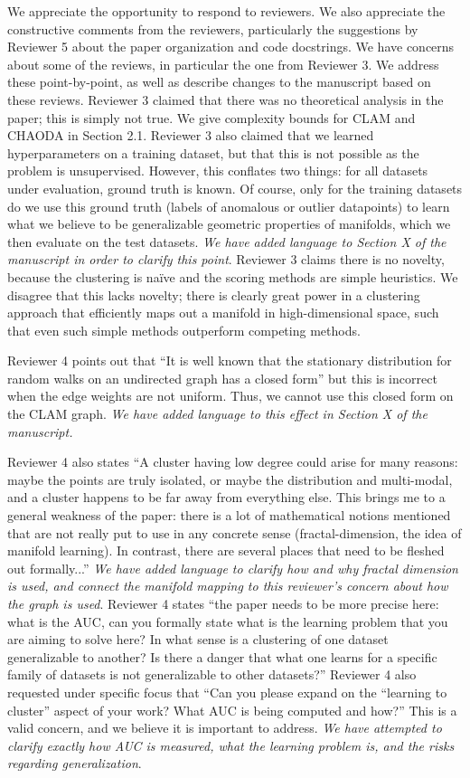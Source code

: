 \documentclass{article}
\begin{document}
We appreciate the opportunity to respond to reviewers.
We also appreciate the constructive comments from the reviewers, particularly the suggestions by Reviewer 5 about the paper organization and code docstrings.
We have concerns about some of the reviews, in particular the one from Reviewer 3.
We address these point-by-point, as well as describe changes to the manuscript based on these reviews.
Reviewer 3 claimed that there was no theoretical analysis in the paper; this is simply not true.
We give complexity bounds for CLAM and CHAODA in Section 2.1.
Reviewer 3 also claimed that we learned hyperparameters on a training dataset, but that this is not possible as the problem is unsupervised.
However, this conflates two things: for all datasets under evaluation, ground truth is known.
Of course, only for the training datasets do we use this ground truth (labels of anomalous or outlier datapoints) to learn what we believe to be generalizable geometric properties of manifolds, which we then evaluate on the test datasets.
\emph{We have added language to Section X of the manuscript in order to clarify this point}.
Reviewer 3 claims there is no novelty, because the clustering is na\"ive and the scoring methods are simple heuristics.
We disagree that this lacks novelty; there is clearly great power in a clustering approach that efficiently maps out a manifold in high-dimensional space, such that even such simple methods outperform competing methods.

Reviewer 4 points out that ``It is well known that the stationary distribution for random walks on an undirected graph has a closed form'' but this is incorrect when the edge weights are not uniform.
Thus, we cannot use this closed form on the CLAM graph.
\emph{We have added language to this effect in Section X of the manuscript.}

Reviewer 4 also states ``A cluster having low degree could arise for many reasons: maybe the points are truly isolated, or maybe the distribution and multi-modal, and a cluster happens to be far away from everything else. 
This brings me to a general weakness of the paper: there is a lot of mathematical notions mentioned that are not really put to use in any concrete sense (fractal-dimension, the idea of manifold learning). In contrast, there are several places that need to be fleshed out formally...''
\emph{We have added language to clarify how and why fractal dimension is used, and connect the manifold mapping to this reviewer's concern about how the graph is used}.
Reviewer 4 states ``the paper needs to be more precise here: what is the AUC, can you formally state what is the learning problem that you are aiming to solve here? In what sense is a clustering of one dataset generalizable to another? Is there a danger that what one learns for a specific family of datasets is not generalizable to other datasets?''
Reviewer 4 also requested under specific focus that ``Can you please expand on the ``learning to cluster'' aspect of your work? What AUC is being computed and how?''
This is a valid concern, and we believe it is important to address.
\emph{We have attempted to clarify exactly how AUC is measured, what the learning problem is, and the risks regarding generalization}.
\end{document}
